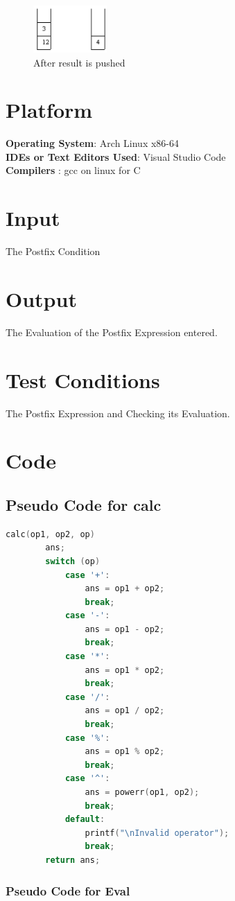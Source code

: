 \documentclass[11pt]{article}
\begin{document}
\begin{enumerate}
	      \begin{figure}[H]
		      \centering
		      \includegraphics[width=0.25\textwidth]{stack 5.png}
		      \caption{After result is pushed}
	      \end{figure}
\end{enumerate}
\section{Platform}
\textbf{Operating System}: Arch Linux x86-64 \\
\textbf{IDEs or Text Editors Used}: Visual Studio Code\\
\textbf{Compilers} : gcc on linux for C\\

\section{Input}
The Postfix Condition
\section{Output}
The Evaluation of the Postfix Expression entered.
\section{Test Conditions}
The Postfix Expression and Checking its Evaluation.
\section{Code}
\subsection{Pseudo Code for calc}
\begin{lstlisting}[language=C]
	calc(op1, op2, op)
		ans;
		switch (op)
			case '+':
				ans = op1 + op2;
				break;
			case '-':
				ans = op1 - op2;
				break;
			case '*':
				ans = op1 * op2;
				break;
			case '/':
				ans = op1 / op2;
				break;
			case '%':
				ans = op1 % op2;
				break;
			case '^':
				ans = powerr(op1, op2);
				break;
			default:
				printf("\nInvalid operator");
				break;
		return ans;
\end{lstlisting}
\subsubsection{Pseudo Code for Eval}
\end{document}
